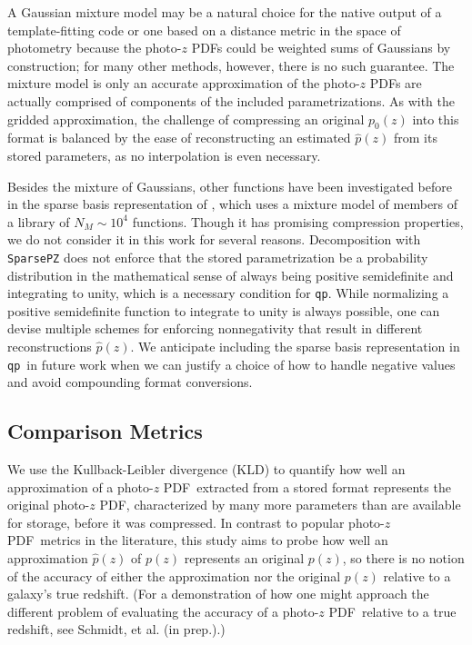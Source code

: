 \documentclass[\docopts]{\docclass}
\newcommand{\qp}{\texttt{qp}}
\newcommand{\pz}{photo-$z$ PDF}
\begin{document}
A Gaussian mixture model may be a natural choice for the native output of a 
template-fitting code or one based on a distance metric in the space of 
photometry because the \pz s could be weighted sums of Gaussians by 
construction; for many other methods, however, there is no such guarantee.  The 
mixture model is only an accurate approximation of the \pz s are actually 
comprised of components of the included parametrizations.  As with the gridded 
approximation, the challenge of compressing an original $p_{0}(z)$ into this 
format is balanced by the ease of reconstructing an estimated $\hat{p}(z)$ from 
its stored parameters, as no interpolation is even necessary.

Besides the mixture of Gaussians, other functions have been investigated before 
in the sparse basis representation of \citet{carrasco_kind_sparse_2014}, which 
uses a mixture model of members of a library of $N_{M}\sim10^{4}$ functions.  
Though it has promising compression properties, we do not consider it in this 
work for several reasons.  Decomposition with \texttt{SparsePZ} does not 
enforce that the stored parametrization be a probability distribution in the 
mathematical sense of always being positive semidefinite and integrating to 
unity, which is a necessary condition for \qp.  While normalizing a positive 
semidefinite function to integrate to unity is always possible, one can devise 
multiple schemes for enforcing nonnegativity that result in different 
reconstructions $\hat{p}(z)$.   We anticipate including the sparse basis 
representation in \qp\ in future work when we can justify a choice of how to 
handle negative values and avoid compounding format conversions.


\subsection{Comparison Metrics}
\label{sec:metrics}

We use the Kullback-Leibler divergence (KLD) to quantify how well an 
approximation of a \pz\ extracted from a stored format represents the original 
\pz, characterized by many more parameters than are available for storage, 
before it was compressed.  In contrast to popular \pz\ metrics in the 
literature, this study aims to probe how well an approximation $\hat{p}(z)$ of 
$p(z)$ represents an original $p(z)$, so there is no notion of the accuracy of 
either the approximation nor the original $p(z)$ relative to a galaxy's true 
redshift.  (For a demonstration of how one might approach the different problem 
of evaluating the accuracy of a \pz\ relative to a true redshift, see Schmidt, 
et al. (in prep.).)
\end{document}
